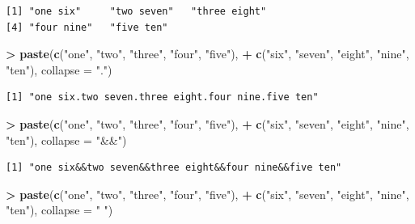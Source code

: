 \documentclass[]{krantz}
\makeatletter
\newenvironment{Shaded}{\begin{snugshade}}{\end{snugshade}}
\newcommand{\KeywordTok}[1]{\textcolor[rgb]{0.27,0.27,0.27}{\textbf{#1}}}
\newcommand{\DataTypeTok}[1]{\textcolor[rgb]{0.27,0.27,0.27}{#1}}
\newcommand{\StringTok}[1]{\textcolor[rgb]{0.5,0.5,0.5}{#1}}
\newcommand{\OperatorTok}[1]{\textcolor[rgb]{0.43,0.43,0.43}{\textbf{#1}}}
\newcommand{\NormalTok}[1]{#1}
\newenvironment{kframe}{%
\medskip{}
\setlength{\fboxsep}{.8em}
 \def\at@end@of@kframe{}%
 \ifinner\ifhmode%
  \def\at@end@of@kframe{\end{minipage}}%
  \begin{minipage}{\columnwidth}%
 \fi\fi%
 \def\FrameCommand##1{\hskip\@totalleftmargin \hskip-\fboxsep
 \colorbox{shadecolor}{##1}\hskip-\fboxsep
     \hskip-\linewidth \hskip-\@totalleftmargin \hskip\columnwidth}%
 \MakeFramed {\advance\hsize-\width
   \@totalleftmargin\z@ \linewidth\hsize
   \@setminipage}}%
 {\par\unskip\endMakeFramed%
 \at@end@of@kframe}
\renewenvironment{Shaded}{\begin{kframe}}{\end{kframe}}
\makeatother
\begin{document}
\begin{verbatim}
[1] "one six"     "two seven"   "three eight"
[4] "four nine"   "five ten"   
\end{verbatim}

\begin{Shaded}
\begin{Highlighting}[]
\OperatorTok{>}\StringTok{ }\KeywordTok{paste}\NormalTok{(}\KeywordTok{c}\NormalTok{(}\StringTok{"one"}\NormalTok{, }\StringTok{"two"}\NormalTok{, }\StringTok{"three"}\NormalTok{, }\StringTok{"four"}\NormalTok{, }\StringTok{"five"}\NormalTok{), }
\OperatorTok{+}\StringTok{       }\KeywordTok{c}\NormalTok{(}\StringTok{"six"}\NormalTok{, }\StringTok{"seven"}\NormalTok{, }\StringTok{"eight"}\NormalTok{, }\StringTok{"nine"}\NormalTok{, }\StringTok{"ten"}\NormalTok{), }\DataTypeTok{collapse =} \StringTok{"."}\NormalTok{)}
\end{Highlighting}
\end{Shaded}

\begin{verbatim}
[1] "one six.two seven.three eight.four nine.five ten"
\end{verbatim}

\begin{Shaded}
\begin{Highlighting}[]
\OperatorTok{>}\StringTok{ }\KeywordTok{paste}\NormalTok{(}\KeywordTok{c}\NormalTok{(}\StringTok{"one"}\NormalTok{, }\StringTok{"two"}\NormalTok{, }\StringTok{"three"}\NormalTok{, }\StringTok{"four"}\NormalTok{, }\StringTok{"five"}\NormalTok{),  }
\OperatorTok{+}\StringTok{       }\KeywordTok{c}\NormalTok{(}\StringTok{"six"}\NormalTok{, }\StringTok{"seven"}\NormalTok{, }\StringTok{"eight"}\NormalTok{, }\StringTok{"nine"}\NormalTok{, }\StringTok{"ten"}\NormalTok{), }\DataTypeTok{collapse =} \StringTok{"&&"}\NormalTok{)}
\end{Highlighting}
\end{Shaded}

\begin{verbatim}
[1] "one six&&two seven&&three eight&&four nine&&five ten"
\end{verbatim}

\begin{Shaded}
\begin{Highlighting}[]
\OperatorTok{>}\StringTok{ }\KeywordTok{paste}\NormalTok{(}\KeywordTok{c}\NormalTok{(}\StringTok{"one"}\NormalTok{, }\StringTok{"two"}\NormalTok{, }\StringTok{"three"}\NormalTok{, }\StringTok{"four"}\NormalTok{, }\StringTok{"five"}\NormalTok{),}
\OperatorTok{+}\StringTok{       }\KeywordTok{c}\NormalTok{(}\StringTok{"six"}\NormalTok{, }\StringTok{"seven"}\NormalTok{, }\StringTok{"eight"}\NormalTok{, }\StringTok{"nine"}\NormalTok{, }\StringTok{"ten"}\NormalTok{), }\DataTypeTok{collapse =} \StringTok{" "}\NormalTok{)}
\end{Highlighting}
\end{Shaded}
\end{document}
